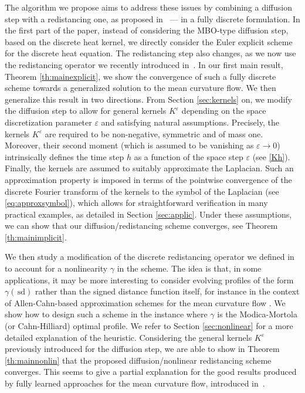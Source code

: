 \documentclass[10pt]{amsart}
\theoremstyle{plain}
\theoremstyle{definition}
\newcommand{\g}{\gamma}
\newcommand{\e}{\varepsilon}
\newcommand{\sd}{\,\mathrm{sd}}
\numberwithin{equation}{section}
\begin{document}
The algorithm we propose aims to address these issues by combining a diffusion step with a redistancing one, as proposed in~\cite{KimNot,EsedogluRuuthTsai10} ---  in a fully discrete formulation. In the first part of the paper, instead of considering the MBO-type diffusion step, based on the discrete heat kernel, we  directly consider the Euler explicit scheme for the discrete heat equation. The redistancing step also changes, as we now use the redistancing operator we recently introduced in~\cite{CDGM-crystal}.
In our first main result, Theorem \ref{th:mainexplicit}, we show the convergence of such a fully discrete scheme  towards a generalized solution to the mean curvature flow. 
We then generalize this result in two directions. From Section  \ref{sec:kernels} on, we modify the diffusion step to allow for general kernels $K^\e$ depending on the space discretization parameter $\e$ and satisfying natural assumptions. Precisely, the kernels $K^\e$ are required to be  non-negative, symmetric and of mass one. Moreover, their second moment (which is assumed to be vanishing as $\varepsilon \to 0$) intrinsically defines the time step $h$ as a function of the  space step $\varepsilon$ (see \eqref{Kh}). Finally, the kernels are assumed to suitably approximate the Laplacian. Such an approximation property is imposed  in terms of the pointwise convergence of the discrete Fourier transform of the kernels to  the symbol of the Laplacian (see \eqref{eq:approxsymbol}),  which  allows for straightforward verification in many practical examples, as detailed in Section \ref{sec:applic}. Under these assumptions, we can show that our diffusion/redistancing scheme converges, see Theorem \ref{th:mainimplicit}.

We then study a modification of the discrete redistancing operator we defined in \cite{CDGM-crystal} to account for a nonlinearity $\g$ in the scheme. The idea is that, in some applications, it may be more interesting to consider evolving profiles of the form $\g(\sd)$ rather than the signed distance function itself, for instance 
in the context of  Allen-Cahn-based approximation schemes for the mean curvature flow \cite{Alberti96, DeepLearningMCF}. We show how to design such a scheme in the instance where $\g$ is the Modica-Mortola
(or Cahn-Hilliard) optimal profile. We refer to Section \ref{sec:nonlinear} for a more detailed explanation of the heuristic.  Considering the general kernels $K^\e$ previously introduced for the diffusion step, we are able to show in  Theorem \ref{th:mainnonlin} that  the proposed  
diffusion/nonlinear redistancing scheme converges. This seems to give  a partial explanation for the good results produced by fully learned approaches for the mean curvature flow, introduced in~\cite{DeepLearningMCF}.
\end{document}

